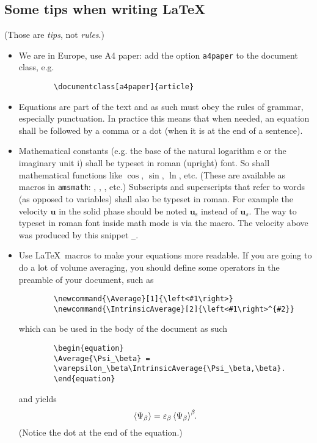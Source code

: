 \documentclass[a4paper]{article}
\newcommand{\Average}[1]{\left<#1\right>}
\newcommand{\IntrinsicAverage}[2]{\left<#1\right>^{#2}}
\begin{document}
\subsection{Some tips when writing \LaTeX}
(Those are \emph{tips}, not \emph{rules}.)
\begin{itemize}

    \item We are in Europe, use A4 paper: add the option \texttt{a4paper} to 
    the document class, e.g.
    \begin{verbatim}
        \documentclass[a4paper]{article}
    \end{verbatim}

    \item Equations are part of the text and as such must obey the rules of 
        grammar, especially punctuation.
        In practice this means that when needed, an equation shall be followed
        by a comma or a dot (when it is at the end of a sentence).

    \item Mathematical constants (e.g. the base of the natural logarithm
        $\mathrm{e}$ or the imaginary unit $\mathrm{i}$) shall be typeset in
        roman (upright) font. So shall mathematical functions like $\cos$,
        $\sin$, $\ln$, etc. (These are available as macros in \texttt{amsmath}:
        \texttt{\cos}, \texttt{\sin},
        \texttt{\ln}, etc.) Subscripts and superscripts that refer to
        words (as opposed to variables) shall also be typeset in roman. For
        example the velocity $\bm{u}$ in the solid phase should be noted
        $\bm{u}_\text{s}$ instead of $\bm{u}_s$. The way to typeset in roman
        font inside math mode is via the \texttt{\text} macro. The
        velocity above was produced by this snippet 
        \texttt{_}.

    \item Use \LaTeX\ macros to make your equations more readable. If you are
    going to do a lot of volume averaging, you should define some operators
    in the preamble of your document, such as
    \begin{verbatim}
        \newcommand{\Average}[1]{\left<#1\right>}
        \newcommand{\IntrinsicAverage}[2]{\left<#1\right>^{#2}}
    \end{verbatim}
    which can be used in the body of the document as such
    \begin{verbatim}
        \begin{equation}
        \Average{\Psi_\beta} =
        \varepsilon_\beta\IntrinsicAverage{\Psi_\beta,\beta}.
        \end{equation}
    \end{verbatim}
    and yields
    \begin{equation}
        \Average{\Psi_\beta} =
    \varepsilon_\beta\IntrinsicAverage{\Psi_\beta}{\beta}\negthickspace .
    \end{equation}
    (Notice the dot at the end of the equation.)


\end{itemize}
\end{document}
